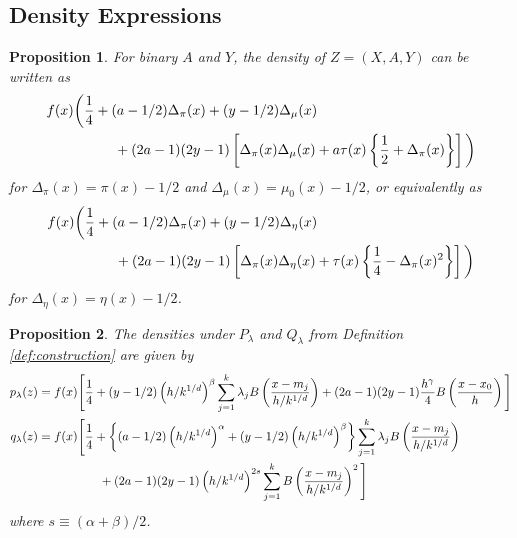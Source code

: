 \documentclass[11pt,twoside]{article}
\newtheorem{propositionapp}{Proposition}
\theoremstyle{definition}
\theoremstyle{remark}
\begin{document}
\bigskip

\subsection{Density Expressions} 

\begin{propositionapp} \label{prop:dens}
For binary $A$ and $Y$, the density of $Z=(X,A,Y)$ can be written as
\begin{align*}
f(x) & \bigg( \frac{1}{4} + (a-1/2) \Delta_\pi(x) + (y-1/2)  \Delta_\mu(x)  \\
& \hspace{.4in}  + (2a-1)(2y-1) \left[ \Delta_\pi(x) \Delta_\mu(x) + a \tau(x) \left\{ \frac{1}{2} + \Delta_\pi(x) \right\}   \right] \bigg) 
\end{align*}
for $\Delta_\pi(x) = \pi(x) - 1/2$ and $\Delta_\mu(x) = \mu_0(x)-1/2$, or equivalently as
\begin{align*}
f(x) & \bigg( \frac{1}{4} + (a-1/2) \Delta_\pi(x) + (y-1/2)  \Delta_\eta(x)  \\
&\hspace{.4in} + (2a-1)(2y-1) \left[ \Delta_\pi(x) \Delta_\eta(x) + \tau(x) \left\{ \frac{1}{4} - \Delta_\pi(x)^2 \right\}   \right] \bigg) 
\end{align*}
for $\Delta_\eta(x) = \eta(x)-1/2$. 
\end{propositionapp}

\bigskip

\begin{propositionapp} \label{prop:dens2}
The densities under $P_\lambda$ and $Q_\lambda$ from Definition \ref{def:construction} are given by
\begin{align*}
p_\lambda(z) &= f(x) \Bigg[ \frac{1}{4} + (y-1/2) \left( h/k^{1/d} \right)^{\beta} \sum_{j=1}^k \lambda_j B \left( \frac{x-m_j}{h/k^{1/d}}  \right) + (2a-1)(2y-1) \frac{h^\gamma}{4} B\left( \frac{x-x_0}{h} \right) \Bigg] \\
q_\lambda(z) &= f(x) \Bigg[ \frac{1}{4} + \left\{ (a-1/2)  \left( h/k^{1/d} \right)^\alpha + (y-1/2)    \left( h/k^{1/d} \right)^\beta \right\} \sum_{j=1}^k \lambda_j B \left( \frac{x-m_j}{h/k^{1/d}}  \right)  \\
& \hspace{.7in}  + (2a-1)(2y-1)  \left( h/k^{1/d} \right)^{2s} \sum_{j=1}^k B \left( \frac{x-m_j}{h/k^{1/d}}  \right) ^2  \Bigg] 
\end{align*}
where $s \equiv (\alpha+\beta)/2$. 
\end{propositionapp} 
 
\end{document}
